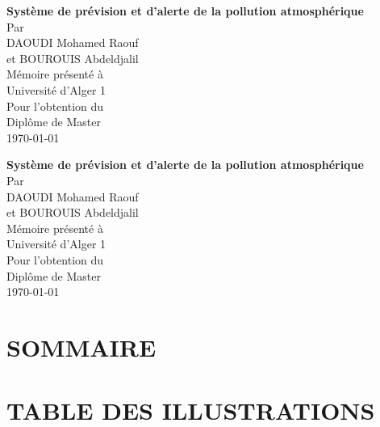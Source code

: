 \documentclass[12pt,a4paper]{report}
\begin{document}
\begin{titlepage}
\begin{center}
    \vspace*{2cm}
    {\LARGE\textbf{Système de prévision et d’alerte de la pollution atmosphérique}}\\[1cm]
    {\large Par}\\[0.5cm]
    {\large DAOUDI Mohamed Raouf}\\
    {\large et BOUROUIS Abdeldjalil}\\[1cm]
    {\large Mémoire présenté à}\\
    {\large Université d'Alger 1}\\[1cm]
    {\large Pour l'obtention du}\\
    {\large Diplôme de Master}\\[2cm]
    {\large \today}
\end{center}
\end{titlepage}

\newpage
\thispagestyle{empty}
\mbox{}

\newpage
\begin{titlepage}
\begin{center}
    \vspace*{2cm}
    {\LARGE\textbf{Système de prévision et d’alerte de la pollution atmosphérique}}\\[1cm]
    {\large Par}\\[0.5cm]
    {\large DAOUDI Mohamed Raouf}\\
    {\large et BOUROUIS Abdeldjalil}\\[1cm]
    {\large Mémoire présenté à}\\
    {\large Université d'Alger 1}\\[1cm]
    {\large Pour l'obtention du}\\
    {\large Diplôme de Master}\\[2cm]
    {\large \today}
\end{center}
\end{titlepage}

\newpage
{}
{}
\chapter*{SOMMAIRE}
\tableofcontents

\newpage
{}
{}
\chapter*{TABLE DES ILLUSTRATIONS}
\listoffigures
\end{document}
